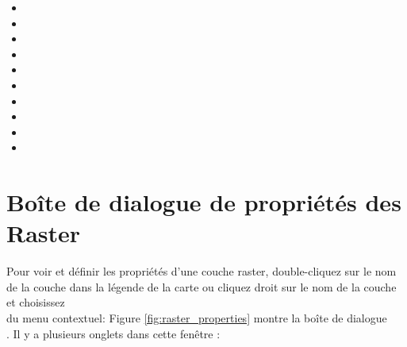 \begin{itemize}[label=--]
\item {}
\item {}
\item {}
\item {}
\item {}
\item {}
\item {}
\item {}
\item {}
\item {}
\end{itemize}

\section{Boîte de dialogue de propriétés des Raster}\label{label_rasterprop}

Pour voir et définir les propriétés d'une couche raster, double-cliquez sur le nom de la couche dans la légende de la carte ou cliquez droit sur le nom de la couche et choisissez\\  du menu
contextuel:  Figure
\ref{fig:raster_properties} montre la boîte de dialogue\\ . Il y a plusieurs onglets dans cette fenêtre :

